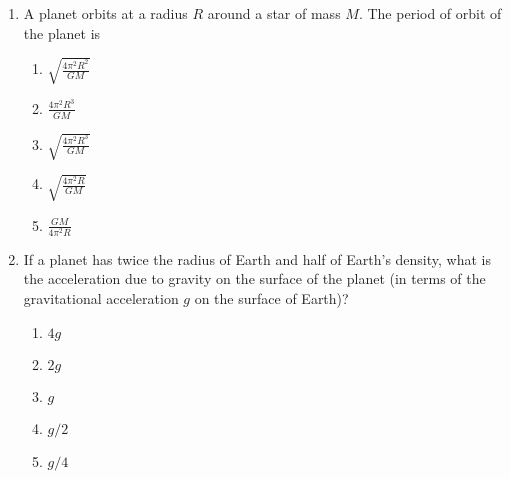 \documentclass{../../../oss-apphys}
\begin{document}
\begin{multicols}{2}
\begin{enumerate}[leftmargin=18pt,resume]
  \item A planet orbits at a radius $R$ around a star of mass $M$. The period of
    orbit of the planet is
    \begin{enumerate}[nosep,leftmargin=18pt,label=(\Alph*)]
    \item $\displaystyle\sqrt{\frac{4\pi^2R^2}{GM}}$
    \item $\displaystyle\frac{4\pi^2R^3}{GM}$
    \item $\displaystyle\sqrt{\frac{4\pi^2R^3}{GM}}$
    \item $\displaystyle\sqrt{\frac{4\pi^2R}{GM}}$
    \item $\displaystyle\frac{GM}{4\pi^2R}$
    \end{enumerate}
    \columnbreak

  \item If a planet has twice the radius of Earth and half of Earth's density,
    what is the acceleration due to gravity on the surface of the planet (in
    terms of the gravitational acceleration $g$ on the surface of Earth)?
    \begin{enumerate}[nosep,leftmargin=18pt,label=(\Alph*)]
    \item $4g$
    \item $2g$
    \item $g$
    \item $g/2$
    \item $g/4$
    \end{enumerate}


\end{enumerate}
\end{multicols}
\end{document}
